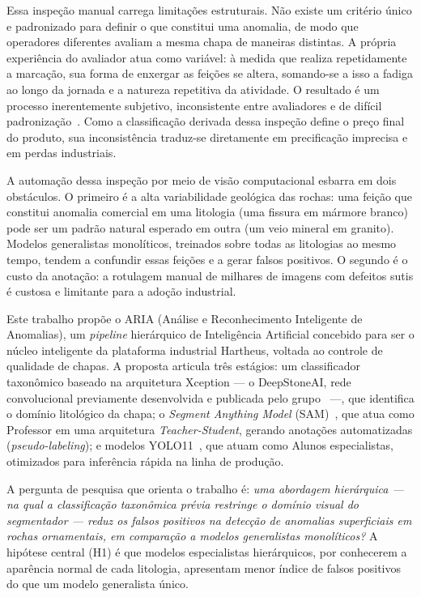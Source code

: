\documentclass[12pt]{article}
\begin{document}
Essa inspeção manual carrega limitações estruturais. Não existe um critério único e padronizado para definir o que constitui uma anomalia, de modo que operadores diferentes avaliam a mesma chapa de maneiras distintas. A própria experiência do avaliador atua como variável: à medida que realiza repetidamente a marcação, sua forma de enxergar as feições se altera, somando-se a isso a fadiga ao longo da jornada e a natureza repetitiva da atividade. O resultado é um processo inerentemente subjetivo, inconsistente entre avaliadores e de difícil padronização~\cite{stone_subjectivity_castro2018}. Como a classificação derivada dessa inspeção define o preço final do produto, sua inconsistência traduz-se diretamente em precificação imprecisa e em perdas industriais.

A automação dessa inspeção por meio de visão computacional esbarra em dois obstáculos. O primeiro é a alta variabilidade geológica das rochas: uma feição que constitui anomalia comercial em uma litologia (uma fissura em mármore branco) pode ser um padrão natural esperado em outra (um veio mineral em granito). Modelos generalistas monolíticos, treinados sobre todas as litologias ao mesmo tempo, tendem a confundir essas feições e a gerar falsos positivos. O segundo é o custo da anotação: a rotulagem manual de milhares de imagens com defeitos sutis é custosa e limitante para a adoção industrial.

Este trabalho propõe o ARIA (Análise e Reconhecimento Inteligente de Anomalias), um \textit{pipeline} hierárquico de Inteligência Artificial concebido para ser o núcleo inteligente da plataforma industrial Hartheus, voltada ao controle de qualidade de chapas. A proposta articula três estágios: um classificador taxonômico baseado na arquitetura Xception --- o DeepStoneAI, rede convolucional previamente desenvolvida e publicada pelo grupo~\cite{deepstoneai_moreira2025} ---, que identifica o domínio litológico da chapa; o \textit{Segment Anything Model} (SAM)~\cite{sam_kirillov2023}, que atua como Professor em uma arquitetura \textit{Teacher-Student}, gerando anotações automatizadas (\textit{pseudo-labeling}); e modelos YOLO11~\cite{yolo11_khanam2024}, que atuam como Alunos especialistas, otimizados para inferência rápida na linha de produção.

A pergunta de pesquisa que orienta o trabalho é: \textit{uma abordagem hierárquica --- na qual a classificação taxonômica prévia restringe o domínio visual do segmentador --- reduz os falsos positivos na detecção de anomalias superficiais em rochas ornamentais, em comparação a modelos generalistas monolíticos?} A hipótese central (H1) é que modelos especialistas hierárquicos, por conhecerem a aparência normal de cada litologia, apresentam menor índice de falsos positivos do que um modelo generalista único.
\end{document}
